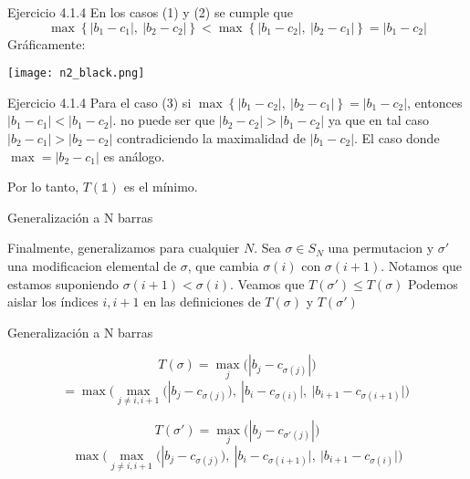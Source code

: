 \documentclass{beamer}
\newcounter{Ejercicio}
\begin{document}
\begin{frame}{Ejercicio 4.1.4}
En los casos (1) y (2) se cumple que 
\[\max \left\{ |b_1 - c_1|,\ |b_2 - c_2| \right\}<\max \left\{ |b_1 - c_2|,\ |b_2 - c_1| \right\}=|b_1-c_2|\]
\pause
Gráficamente:
\begin{center}
\texttt{[image: n2\_black.png]}
\end{center}
\end{frame}

\begin{frame}{Ejercicio 4.1.4}
    Para el caso (3) si $\max \left\{ |b_1 - c_2|,\ |b_2 - c_1| \right\}=|b_1-c_2|$, entonces $|b_1-c_1|<|b_1-c_2|$. \pause
    no puede ser que $|b_2 - c_2| > |b_1-c_2|$ ya que en tal caso $|b_2 - c_1| > |b_2-c_2|$ contradiciendo la maximalidad de $|b_1-c_2|$. \pause El caso donde \(\max =|b_2 - c_1|\) es análogo. \pause

    Por lo tanto, \(T(\mathds{1})\) es el mínimo. 
\end{frame}

\begin{frame}{Generalización a N barras}

Finalmente, generalizamos para cualquier $N$.\pause 
Sea $\sigma \in S_N$ una permutacion y $\sigma'$ una modificacion elemental de $\sigma$, que cambia $\sigma(i)$ con $\sigma(i+1)$. \pause Notamos que estamos suponiendo $\sigma(i+1)<\sigma(i)$. Veamos que $T(\sigma') \leq T(\sigma)$
\pause
Podemos aislar los índices $i, i+1$ en las definiciones de $T(\sigma)$ y $T(\sigma')$

\end{frame}

\begin{frame}{Generalización a N barras}

\[T(\sigma) = \max_j \big( |b_j - c_{\sigma(j)}| \big) \]
\[=\max \Big( \max_{j\neq i, i+1} \big( |b_j - c_{\sigma(j)} \big),\ |b_i - c_{\sigma(i)}|,\ |b_{i+1} - c_{\sigma(i+1)}| \Big) \;\]

\[T(\sigma') = \max_j \big( |b_j - c_{\sigma'(j)}| \big)\]
\[\max \Big( \max_{j\neq i, i+1} \big( |b_j - c_{\sigma(j)} \big),\ |b_i - c_{\sigma(i+1)}|,\ |b_{i+1} - c_{\sigma(i)}| \Big)\]

\end{frame}
\end{document}
